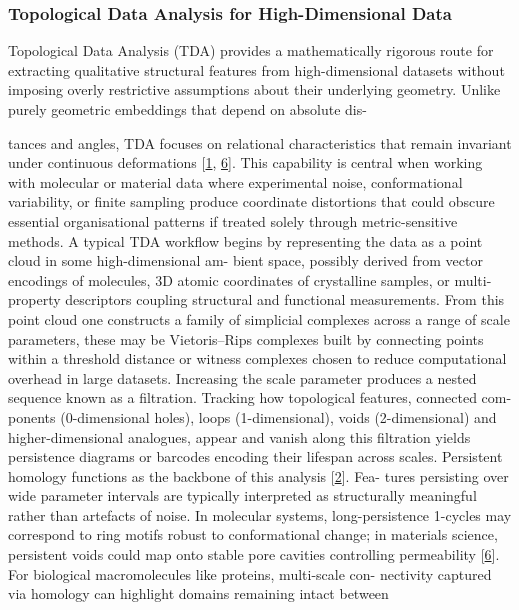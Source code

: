 \documentclass[
]{article}
\begin{document}
\subsubsection{Topological Data Analysis for High-Dimensional
Data}\label{topological-data-analysis-for-high-dimensional-data}

Topological Data Analysis (TDA) provides a mathematically rigorous route
for extracting qualitative structural features from high-dimensional
datasets without imposing overly restrictive assumptions about their
underlying geometry. Unlike purely geometric embeddings that depend on
absolute dis-

tances and angles, TDA focuses on relational characteristics that remain
invariant under continuous deformations {[}\hyperref[_bookmark41]{1},
\hyperref[_bookmark46]{6}{]}. This capability is central when working
with molecular or material data where experimental noise, conformational
variability, or finite sampling produce coordinate distortions that
could obscure essential organisational patterns if treated solely
through metric-sensitive methods. A typical TDA workflow begins by
representing the data as a point cloud in some high-dimensional am-
bient space, possibly derived from vector encodings of molecules, 3D
atomic coordinates of crystalline samples, or multi-property descriptors
coupling structural and functional measurements. From this point cloud
one constructs a family of simplicial complexes across a range of scale
parameters, these may be Vietoris--Rips complexes built by connecting
points within a threshold distance or witness complexes chosen to reduce
computational overhead in large datasets. Increasing the scale parameter
produces a nested sequence known as a filtration. Tracking how
topological features, connected com- ponents (0-dimensional holes),
loops (1-dimensional), voids (2-dimensional) and higher-dimensional
analogues, appear and vanish along this filtration yields persistence
diagrams or barcodes encoding their lifespan across scales. Persistent
homology functions as the backbone of this analysis
{[}\hyperref[_bookmark42]{2}{]}. Fea- tures persisting over wide
parameter intervals are typically interpreted as structurally meaningful
rather than artefacts of noise. In molecular systems, long-persistence
1-cycles may correspond to ring motifs robust to conformational change;
in materials science, persistent voids could map onto stable pore
cavities controlling permeability {[}\hyperref[_bookmark46]{6}{]}. For
biological macromolecules like proteins, multi-scale con- nectivity
captured via homology can highlight domains remaining intact between
\end{document}
